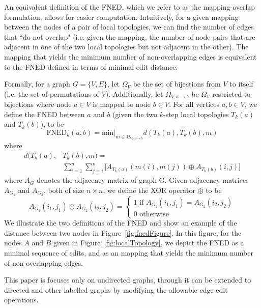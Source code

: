 \documentclass{article}
\begin{document}
An equivalent definition of the FNED, which we refer to as the mapping-overlap formulation, allows for easier computation. Intuitively, for a given mapping between the nodes of a pair of local topologies, we can find the number of edges that ``do not overlap" (i.e. given the mapping, the number of node-pairs that are adjacent in one of the two local topologies but not adjacent in the other). The mapping that yields the minimum number of non-overlapping edges is equivalent to the FNED defined in terms of minimal edit distance.

Formally, for a graph $G = \{V,E\}$, let $\Omega_{V}$ be the set of bijections from $V$ to itself (i.e. the set of permutations of $V$). Additionally, let $\Omega_{V, a\rightarrow b}$ be $\Omega_{V}$ restricted to bijections where node $a\in V$ is mapped to node $b\in V$. For all vertices $a,b \in V$, we define the FNED between $a$ and $b$ (given the two $k$-step local topologies $T_{k}(a)$ and $T_{k}(b)$), to be
\begin{equation}
\text{FNED}_{k}(a,b) = \text{min} \big|_{m \in \Omega_{V, a\rightarrow b}} d(T_{k}(a), T_{k}(b), m)
\end{equation}
where
\begin{equation}
\begin{split}
d(T_{k}(a), & T_{k}(b), m) = \\ 
& \sum_{i=1}^{n} \sum_{j=i}^{n} \Big[ A_{T_{k}(a)}(m(i),m(j)) \oplus A_{T_{k}(b)}(i,j)  \Big]
\end{split}
\end{equation}
where $A_{G}$ denotes the adjacency matrix of graph G. Given adjacency matrices $A_{G_{1}}$ and $A_{G_{2}}$, both of size $n \times n$, we define the XOR operator $\oplus$ to be
\begin{equation}
A_{G_{1}}(i_{1},j_{1}) \oplus A_{G_{2}}(i_{2},j_{2}) = 
\begin{cases}
1 \text{ if } A_{G_{1}}(i_{1},j_{1}) = A_{G_{2}}(i_{2},j_{2}) \\ 
0 \text{ otherwise}
\end{cases}
\end{equation}
We illustrate the two definitions of the FNED and show an example of the distance between two nodes in Figure~\ref{fig:fnedFigure}. In this figure, for the nodes $A$ and $B$ given in Figure~\ref{fig:localTopology}, we depict the FNED as a minimal sequence of edits, and as an mapping that yields the minimum number of non-overlapping edges.

This paper is focuses only on undirected graphs, through it can be extended to directed and other labelled graphs by modifying the allowable edge edit operations.
\end{document}
